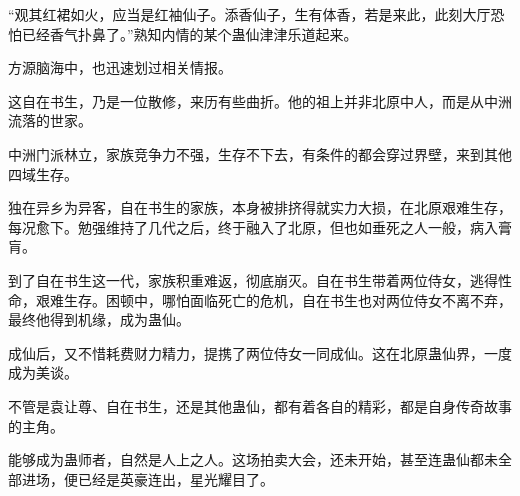 \begin{this_body}
“观其红裙如火，应当是红袖仙子。添香仙子，生有体香，若是来此，此刻大厅恐怕已经香气扑鼻了。”熟知内情的某个蛊仙津津乐道起来。

方源脑海中，也迅速划过相关情报。

这自在书生，乃是一位散修，来历有些曲折。他的祖上并非北原中人，而是从中洲流落的世家。

中洲门派林立，家族竞争力不强，生存不下去，有条件的都会穿过界壁，来到其他四域生存。

独在异乡为异客，自在书生的家族，本身被排挤得就实力大损，在北原艰难生存，每况愈下。勉强维持了几代之后，终于融入了北原，但也如垂死之人一般，病入膏肓。

到了自在书生这一代，家族积重难返，彻底崩灭。自在书生带着两位侍女，逃得性命，艰难生存。困顿中，哪怕面临死亡的危机，自在书生也对两位侍女不离不弃，最终他得到机缘，成为蛊仙。

成仙后，又不惜耗费财力精力，提携了两位侍女一同成仙。这在北原蛊仙界，一度成为美谈。

不管是袁让尊、自在书生，还是其他蛊仙，都有着各自的精彩，都是自身传奇故事的主角。

能够成为蛊师者，自然是人上之人。这场拍卖大会，还未开始，甚至连蛊仙都未全部进场，便已经是英豪连出，星光耀目了。

\end{this_body}

